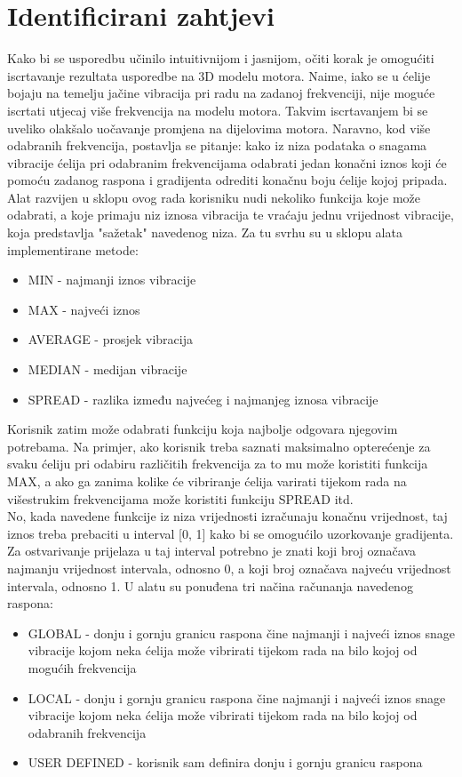 \documentclass[times, utf8, diplomski]{fer}
\begin{document}
\section{Identificirani zahtjevi} \label{requests-section}
Kako bi se usporedbu učinilo intuitivnijom i jasnijom, očiti korak je omogućiti iscrtavanje rezultata usporedbe na 3D modelu motora. Naime, iako se u \citep{matkovic2021getting} ćelije bojaju na temelju jačine vibracija pri radu na zadanoj frekvenciji, nije moguće iscrtati utjecaj više frekvencija na modelu motora. Takvim iscrtavanjem bi se uveliko olakšalo uočavanje promjena na dijelovima motora. Naravno, kod više odabranih frekvencija, postavlja se pitanje: kako iz niza podataka o snagama vibracije ćelija pri odabranim frekvencijama odabrati jedan konačni iznos koji će pomoću zadanog raspona i gradijenta odrediti konačnu boju ćelije kojoj pripada. Alat razvijen u sklopu ovog rada korisniku nudi nekoliko funkcija koje može odabrati, a koje primaju niz iznosa vibracija te vraćaju jednu vrijednost vibracije, koja predstavlja "sažetak" navedenog niza. Za tu svrhu su u sklopu alata implementirane metode:

\begin{itemize}
\item MIN - najmanji iznos vibracije
\item MAX - najveći iznos 
\item AVERAGE - prosjek vibracija
\item MEDIAN - medijan vibracije
\item SPREAD - razlika između najvećeg i najmanjeg iznosa vibracije\\
\end{itemize}

Korisnik zatim može odabrati funkciju koja najbolje odgovara njegovim potrebama. Na primjer, ako korisnik treba saznati maksimalno opterećenje za svaku ćeliju pri odabiru različitih frekvencija za to mu može koristiti funkcija MAX, a ako ga zanima kolike će vibriranje ćelija varirati tijekom rada na višestrukim frekvencijama može koristiti funkciju SPREAD itd.\\

No, kada navedene funkcije iz niza vrijednosti izračunaju konačnu vrijednost, taj iznos treba prebaciti u interval [0, 1] kako bi se omogućilo uzorkovanje gradijenta. Za ostvarivanje prijelaza u taj interval potrebno je znati koji broj označava najmanju vrijednost intervala, odnosno 0, a koji broj označava najveću vrijednost intervala, odnosno 1. U alatu su ponuđena tri načina računanja navedenog raspona:
\begin{itemize}
\item GLOBAL - donju i gornju granicu raspona čine najmanji i najveći iznos snage vibracije kojom neka ćelija može vibrirati tijekom rada na bilo kojoj od mogućih frekvencija
\item LOCAL - donju i gornju granicu raspona čine najmanji i najveći iznos snage vibracije kojom neka ćelija može vibrirati tijekom rada na bilo kojoj od odabranih frekvencija
\item USER DEFINED - korisnik sam definira donju i gornju granicu raspona\\
\end{itemize}
\end{document}
